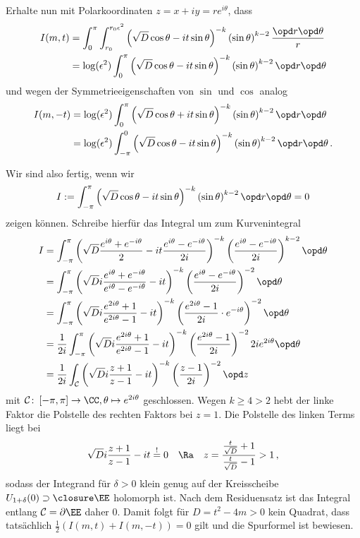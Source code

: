 Erhalte nun mit Polarkoordinaten $z = x + iy = r e^{i \theta}$, dass
\begin{align*}
	I(m,t) 
	&= \int_0^{\pi} \int_{r_0}^{r_0 \epsilon^2} \left( \sqrt{D} \cos \theta - it \sin \theta \right)^{-k} \left( \sin \theta \right)^{k-2} \frac {\opd r \opd \theta}r \\
	&= \log (\epsilon^2) \int_0^\pi \left( \sqrt{D} \cos \theta - it \sin \theta \right)^{-k} \left( \sin \theta \right)^{k-2} \opd r \opd \theta
\end{align*}
und wegen der Symmetrieeigenschaften von $\sin$ und $\cos$ analog
\begin{align*}
	I(m,-t) 
	&= \log (\epsilon^2) \int_0^\pi \left( \sqrt{D} \cos \theta + it \sin \theta \right)^{-k} \left( \sin \theta \right)^{k-2} \opd r \opd \theta \\
	&= \log (\epsilon^2) \int_{-\pi}^0 \left( \sqrt{D} \cos \theta - it \sin \theta \right)^{-k} \left( \sin \theta \right)^{k-2} \opd r \opd \theta
	\,.
\end{align*}

Wir sind also fertig, wenn wir
\[
	I := \int_{-\pi}^\pi \left( \sqrt{D} \cos \theta - it \sin \theta \right)^{-k} \left( \sin \theta \right)^{k-2} \opd r \opd \theta = 0
\]
zeigen können. Schreibe hierfür das Integral um zum Kurvenintegral
\begin{align*}
	I
	&= \int_{-\pi}^{\pi} \left( \sqrt D \frac {e^{i\theta} + e^{-i\theta}}2 - it \frac {e^{i\theta} - e^{-i\theta}}{2i} \right)^{-k} \left( \frac {e^{i\theta} - e^{-i\theta}}{2i} \right)^{k-2} \opd \theta \\
	&= \int_{-\pi}^{\pi} \left( \sqrt D i \frac {e^{i\theta} + e^{-i\theta}}{e^{i\theta} - e^{-i\theta}} - it \right)^{-k} \left( \frac {e^{i\theta} - e^{-i\theta}}{2i} \right)^{-2} \opd \theta \\
	&= \int_{-\pi}^{\pi} \left( \sqrt D i \frac {e^{2i\theta} + 1}{e^{2i\theta} - 1} - it \right)^{-k} \left( \frac {e^{2i\theta} - 1}{2i} \cdot e^{-i\theta} \right)^{-2} \opd \theta \\
	&= \frac 1{2i} \int_{-\pi}^{\pi} \left( \sqrt D i \frac {e^{2i\theta} + 1}{e^{2i\theta} - 1} - it \right)^{-k} \left( \frac {e^{2i\theta} - 1}{2i} \right)^{-2} 2ie^{2i\theta} \opd \theta \\
	&= \frac 1{2i} \int_{\mathcal C} \left( \sqrt D i \frac {z+1}{z-1} - it \right)^{-k} \left( \frac{z-1}{2i} \right)^{-2} \opd z
\end{align*}
mit $\mathcal C \colon \left[ -\pi, \pi \right] \to \CC, \theta \mapsto e^{2i\theta}$ geschlossen. Wegen $k \geq 4 > 2$ hebt der linke Faktor die Polstelle des rechten Faktors bei $z = 1$. Die Polstelle des linken Terms liegt bei
\[
	\sqrt D i \frac{z+1}{z-1} - it \overset != 0 \quad \Ra \quad z = \frac {\frac t{\sqrt{D}} + 1}{\frac t{\sqrt{D}} - 1} > 1
	\,,
\]
sodass der Integrand für $\delta > 0$ klein genug auf der Kreisscheibe $U_{1 + \delta}(0) \supset \closure \EE$ holomorph ist. Nach dem Residuensatz ist das Integral entlang $\mathcal C = \partial \EE$ daher $0$. Damit folgt für $D = t^2 - 4m > 0$ kein Quadrat, dass tatsächlich $\frac 12 \left( I(m,t) + I(m,-t) \right) = 0$ gilt und die Spurformel ist bewiesen.